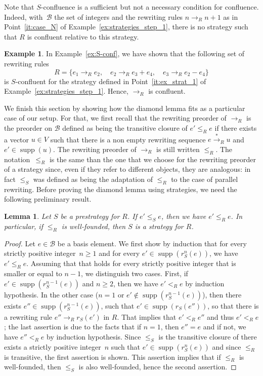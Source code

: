 \documentclass[11pt]{article}
\newtheorem{lemma}[theorem]{Lemma}
\theoremstyle{definition}
\newtheorem{example}[theorem]{Example}
\newcommand\basis{\mathscr{B}}
\newcommand\ordS{\leq_S}
\newcommand\ordR{\leq_R}
\DeclareMathOperator{\supp}{supp}
\newcommand\rewR{\to_R}
\newcommand\transR{\overset{*}{\to}_R}
\begin{document}
Note that $S$-confluence is a sufficient but not a necessary condition for
confluence. Indeed, with~$\basis$ the set of integers and the rewriting rules
$n\rewR n+1$ as in Point~\ref{it:case_N} of
Example~\ref{ex:strategies_step_1}, there is no strategy such that $R$ is
confluent relative to this strategy.
\smallskip

\begin{example}\label{ex:conf}
  In Example~\ref{ex:S-conf}, we have shown that the following set of
  rewriting rules
  \[R=\{e_1\rewR e_2,\quad e_2\rewR e_3+e_4,\quad e_3\rewR e_2-e_4\}\]
  is $S$-confluent for the strategy defined in Point~\ref{it:ex_strat_1}
  of Example~\ref{ex:strategies_step_1}. Hence, $\rewR$ is confluent.
\end{example}
\smallskip

We finish this section by showing how the diamond lemma fits as a
particular case of our setup. For that, we first recall that the
rewriting preorder of $\rewR$ is the preorder on $\basis$ defined as
being the transitive closure of $e'\ordR e$ if there exists a vector
$u\in V$ such that there is a non empty rewriting sequence $e\transR u$
and $e'\in\supp(u)$. The rewriting preorder of $\rewR$ is still written
$\ordR$. The notation~$\ordR$ is the same than the one that we choose for
the rewriting preorder of a strategy since, even if they refer to
different objects, they are analogous: in fact $\ordS$ was defined as
being the adaptation of $\ordR$ to the case of parallel rewriting. Before
proving the diamond lemma using strategies, we need the following
preliminary result.
\smallskip

\begin{lemma}\label{lem:rew_preorder}
  Let $S$ be a prestrategy for $R$. If $e'\ordS e$, then we have
  $e'\ordR e$. In particular, if $\ordR$ is well-founded, then $S$ is a
  strategy for $R$.
\end{lemma}


\begin{proof}
  Let $e\in\basis$ be a basis element. We first show by induction that
  for every strictly positive integer~$n\geq 1$ and for every
  $e'\in\supp(r_S^n(e))$, we have $e'\ordR e$. Assuming that that holds
  for every strictly positive integer that is smaller or equal to $n-1$,
  we distinguish two cases. First, if $e'\in\supp(r_S^{n-1}(e))$ and
  $n\geq 2$, then we have $e'<_Re$ by induction hypothesis. In the other
  case ($n=1$ or $e'\notin\supp(r_S^{n-1}(e))$), then there exists
  $e''\in\supp(r_S^{n-1}(e))$, such that $e'\in\supp(r_S(e''))$, so that
  there is a rewriting rule $e''\rewR r_S(e')$ in $R$. That implies that
  $e'<_Re''$ and thus $e'<_Re$; the last assertion is due to the facts
  that if $n=1$, then $e''=e$ and if not, we have $e''<_Re$ by induction
  hypothesis. Since $\ordS$ is the transitive closure of there exists a
  strictly positive integer~$n$ such that $e'\in\supp(r_S^n(e))$ and
  since $\ordR$ is transitive, the first assertion is shown. This
  assertion implies that if $\ordR$ is well-founded, then $\ordS$ is also
  well-founded, hence the second assertion.
\end{proof}
\smallskip
\end{document}
